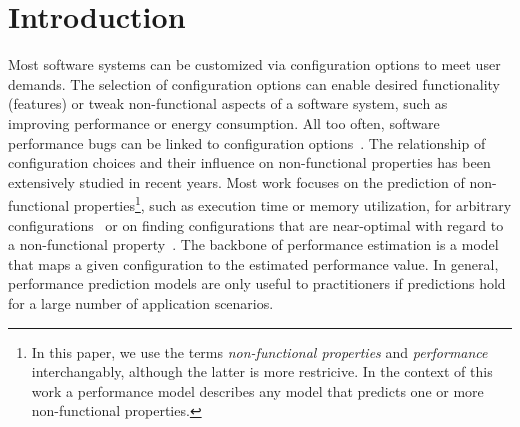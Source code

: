 \section{Introduction}
Most software systems can be customized via configuration options to meet user demands. The selection of configuration options can enable desired functionality (features) or tweak non-functional aspects of a software system, such as improving performance or energy consumption. 
All too often, software performance bugs can be linked to configuration options~\cite{han_empirical_2016}. 
The relationship of configuration choices and their influence on non-functional properties has been extensively studied in recent years. Most work focuses on the prediction of non-functional properties\footnote{In this paper, we use the terms \textit{non-functional properties} and \textit{performance} interchangably, although the latter is more restricive. In the context of this work a performance model describes any model that predicts one or more non-functional properties.}, such as execution time or memory utilization, for arbitrary configurations~\cite{dorn2020,siegmundPerformanceinfluenceModelsHighly2015,haDeepPerf2019,perfAL,guoVariabilityawarePerformancePrediction2013,sarkarCostEfficientSamplingPerformance,guo_2018_data,fourier_learning_2015,perLasso} or on finding configurations that are near-optimal with regard to a non-functional property~\cite{nairUsingBadLearners2017,nairFlash18,ohFindingNearoptimalConfigurations2017}. 
The backbone of performance estimation is a model that maps a given configuration to the estimated performance value. 
In general, performance prediction models are only useful to practitioners if predictions hold for a large number of application scenarios.

